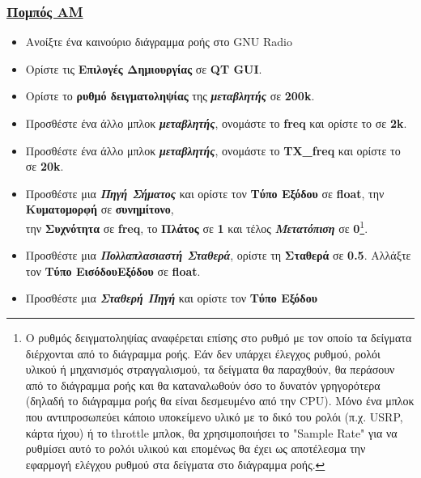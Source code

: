 \documentclass[12pt]{report}
\begin{document}
            \subsubsection*{\textsf{\underline{Πομπός ΑΜ}}}
            \begin{itemize}
                \item Ανοίξτε ένα καινούριο διάγραμμα ροής στο GNU Radio
                \item Ορίστε τις \textbf{Επιλογές Δημιουργίας} σε \textbf{QT GUI}.
                \item Ορίστε το \textbf{ρυθμό δειγματοληψίας} της \textbf{\textit{μεταβλητής}} σε \textbf{200k}.
                \item Προσθέστε ένα άλλο μπλοκ \textbf{\textit{μεταβλητής}},
                    ονομάστε το \textbf{freq} και ορίστε το σε \textbf{2k}.
                \item Προσθέστε ένα άλλο μπλοκ \textbf{\textit{μεταβλητής}}, 
                    ονομάστε το \textbf{TX\_freq} και ορίστε το σε \textbf{20k}.
                \item Προσθέστε μια \textbf{\textit{Πηγή Σήματος}} και ορίστε τον \textbf{Τύπο Εξόδου}
                σε \textbf{float}, την \textbf{Κυματομορφή} σε \textbf{συνημίτονο},\\
                την \textbf{Συχνότητα} σε \textbf{freq}, το \textbf{Πλάτος} σε \textbf{1} και τέλος 
                \textbf{\textit{Μετατόπιση}} σε \textbf{0}\footnote{
                    Ο ρυθμός δειγματοληψίας αναφέρεται επίσης στο ρυθμό με τον οποίο τα δείγματα
                    διέρχονται από το διάγραμμα ροής. Εάν δεν υπάρχει έλεγχος ρυθμού, ρολόι υλικού ή
                    μηχανισμός στραγγαλισμού, τα δείγματα θα παραχθούν, θα περάσουν από το διάγραμμα 
                    ροής και θα καταναλωθούν όσο το δυνατόν γρηγορότερα (δηλαδή το διάγραμμα ροής θα
                    είναι δεσμευμένο από την CPU). Μόνο ένα μπλοκ που αντιπροσωπεύει κάποιο υποκείμενο
                    υλικό με το δικό του ρολόι (π.χ. USRP, κάρτα ήχου) ή το throttle μπλοκ, θα
                    χρησιμοποιήσει το "Sample Rate" για να ρυθμίσει αυτό το ρολόι υλικού και επομένως 
                    θα έχει ως αποτέλεσμα την εφαρμογή ελέγχου ρυθμού στα δείγματα στο διάγραμμα ροής.
                }.
                \item Προσθέστε μια \textbf{\textit{Πολλαπλασιαστή Σταθερά}}, ορίστε τη \textbf{Σταθερά}
                    σε \textbf{0.5}. Αλλάξτε τον \textbf{Τύπο ΕισόδουΕξόδου} σε \textbf{float}.
                \item Προσθέστε μια \textbf{\textit{Σταθερή Πηγή}} και ορίστε τον \textbf{Τύπο Εξόδου}

\end{itemize}
\end{document}
